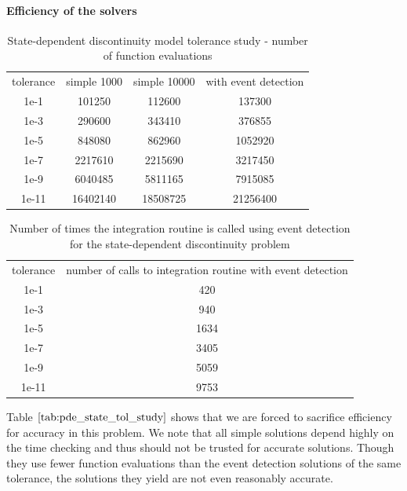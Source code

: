 \paragraph{Efficiency of the solvers}
\begin{table}[h]
\caption {State-dependent discontinuity model tolerance study - number of function evaluations} 
\label{tab:pde_state_tol_study}
\begin{center}
\begin{tabular}{ c c c c } 
tolerance & simple 1000 & simple 10000 & with event detection \\ 
1e-1      &             101250   &              112600   &   137300 \\
1e-3      &             290600   &              343410   &   376855 \\
1e-5      &             848080   &              862960   &  1052920 \\
1e-7      &            2217610     &           2215690   &  3217450\\
1e-9      &            6040485     &           5811165   &  7915085  \\
1e-11     &           16402140     &          18508725   & 21256400 \\
\end{tabular}
\end{center}
\end{table}

\begin{table}[h]
\caption {Number of times the integration routine is called using event detection for the state-dependent discontinuity problem} 
\label{tab:pde_state_tol_num_integrations}
\begin{center}
\begin{tabular}{ c c } 
tolerance & number of calls to integration routine with event detection \\ 
1e-1      &    420 \\
1e-3      &    940 \\
1e-5      & 1634 \\
1e-7      & 3405 \\
1e-9      & 5059 \\
1e-11     & 9753 \\
\end{tabular}
\end{center}
\end{table}

Table $\ref{tab:pde_state_tol_study}$ shows that we are forced to sacrifice efficiency for accuracy in this problem. We note that all simple solutions depend highly on the time checking and thus should not be trusted for accurate solutions. Though they use fewer function evaluations than the event detection solutions of the same tolerance, the solutions they yield are not even reasonably accurate. 

